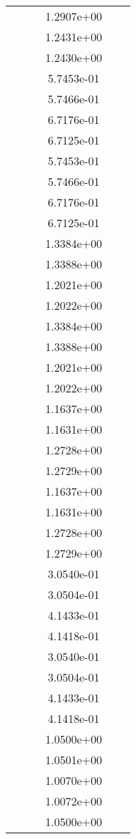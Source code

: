 \begin{xltabular}{\textwidth}{r|rS[table-format=1.3e+2]S[table-format=1.4e+2]S[table-format=1.4e+2]S[table-format=-1.5]}
&  &  & 1.2907e+00 & & \\
&  &  & 1.2431e+00 & & \\
&  &  & 1.2430e+00 & & \\
&  &  & 5.7453e-01 & & \\
&  &  & 5.7466e-01 & & \\
&  &  & 6.7176e-01 & & \\
&  &  & 6.7125e-01 & & \\
&  &  & 5.7453e-01 & & \\
&  &  & 5.7466e-01 & & \\
&  &  & 6.7176e-01 & & \\
&  &  & 6.7125e-01 & & \\
&  &  & 1.3384e+00 & & \\
&  &  & 1.3388e+00 & & \\
&  &  & 1.2021e+00 & & \\
&  &  & 1.2022e+00 & & \\
&  &  & 1.3384e+00 & & \\
&  &  & 1.3388e+00 & & \\
&  &  & 1.2021e+00 & & \\
&  &  & 1.2022e+00 & & \\
&  &  & 1.1637e+00 & & \\
&  &  & 1.1631e+00 & & \\
&  &  & 1.2728e+00 & & \\
&  &  & 1.2729e+00 & & \\
&  &  & 1.1637e+00 & & \\
&  &  & 1.1631e+00 & & \\
&  &  & 1.2728e+00 & & \\
&  &  & 1.2729e+00 & & \\
&  &  & 3.0540e-01 & & \\
&  &  & 3.0504e-01 & & \\
&  &  & 4.1433e-01 & & \\
&  &  & 4.1418e-01 & & \\
&  &  & 3.0540e-01 & & \\
&  &  & 3.0504e-01 & & \\
&  &  & 4.1433e-01 & & \\
&  &  & 4.1418e-01 & & \\
&  &  & 1.0500e+00 & & \\
&  &  & 1.0501e+00 & & \\
&  &  & 1.0070e+00 & & \\
&  &  & 1.0072e+00 & & \\
&  &  & 1.0500e+00 & & \\

\end{xltabular}
